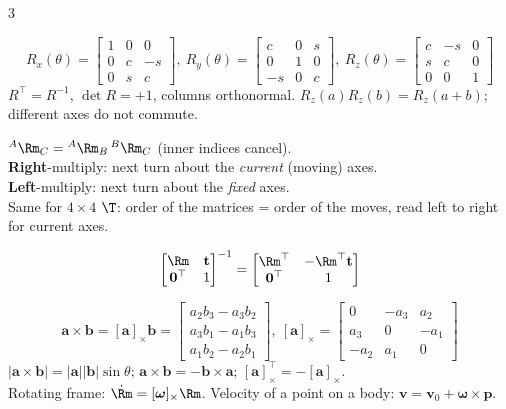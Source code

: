 \begin{multicols}{3}
\begin{fbx}
\[R_x(\theta)=\begin{bmatrix}1&0&0\\0&c&-s\\0&s&c\end{bmatrix},\ R_y(\theta)=\begin{bmatrix}c&0&s\\0&1&0\\-s&0&c\end{bmatrix},\ R_z(\theta)=\begin{bmatrix}c&-s&0\\s&c&0\\0&0&1\end{bmatrix}\]
$R^\top=R^{-1}$, $\det R=+1$, columns orthonormal. $R_z(a)R_z(b)=R_z(a{+}b)$; different axes do not commute.
\end{fbx}
\begin{fbx}
${}^A\Rm_C={}^A\Rm_B\,{}^B\Rm_C$ (inner indices cancel).\\
\textbf{Right}-multiply: next turn about the \emph{current} (moving) axes.\\
\textbf{Left}-multiply: next turn about the \emph{fixed} axes.\\
Same for $4\times4$ $\T$: order of the matrices = order of the moves, read left to right for current axes.
\end{fbx}
\begin{fbx}
\[\begin{bmatrix}\Rm&\mathbf t\\\mathbf 0^\top&1\end{bmatrix}^{-1}=\begin{bmatrix}\Rm^\top&-\Rm^\top\mathbf t\\\mathbf 0^\top&1\end{bmatrix}\]
\end{fbx}
\begin{fbx}
\[\mathbf a\times\mathbf b=[\mathbf a]_\times\mathbf b=\begin{bmatrix}a_2b_3-a_3b_2\\a_3b_1-a_1b_3\\a_1b_2-a_2b_1\end{bmatrix},\ [\mathbf a]_\times=\begin{bmatrix}0&-a_3&a_2\\a_3&0&-a_1\\-a_2&a_1&0\end{bmatrix}\]
$|\mathbf a\times\mathbf b|=|\mathbf a||\mathbf b|\sin\theta$; $\mathbf a\times\mathbf b=-\mathbf b\times\mathbf a$; $[\mathbf a]_\times^\top=-[\mathbf a]_\times$.\\
Rotating frame: $\dot\Rm=[\boldsymbol\omega]_\times\Rm$. Velocity of a point on a body: $\mathbf v=\mathbf v_0+\boldsymbol\omega\times\mathbf p$.
\end{fbx}


\end{multicols}
